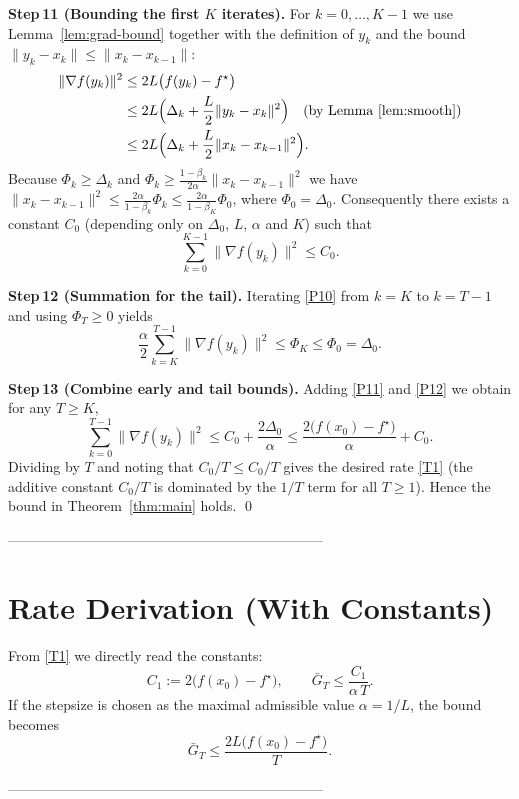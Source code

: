 \documentclass[11pt]{article}
\begin{document}
\noindent\textbf{Step 11 (Bounding the first $K$ iterates).}  
For $k=0,\dots,K-1$ we use Lemma~\ref{lem:grad-bound} together with the
definition of $y_k$ and the bound $\|y_k-x_k\|\le\|x_k-x_{k-1}\|$:
\[
\begin{aligned}
\|\nabla f(y_k)\|^{2}
&\le 2L\bigl(f(y_k)-f^\star\bigr) \\
&\le 2L\Bigl(\Delta_k+\frac{L}{2}\|y_k-x_k\|^{2}\Bigr) \quad\text{(by Lemma~\ref{lem:smooth})}\\
&\le 2L\Bigl(\Delta_k+\frac{L}{2}\|x_k-x_{k-1}\|^{2}\Bigr).
\end{aligned}
\]
Because $\Phi_k\ge\Delta_k$ and $\Phi_k\ge\frac{1-\beta_k}{2\alpha}\|x_k-x_{k-1}\|^{2}$
we have $\|x_k-x_{k-1}\|^{2}\le \frac{2\alpha}{1-\beta_k}\Phi_k\le
\frac{2\alpha}{1-\beta_K}\Phi_0$, where $\Phi_0=\Delta_0$.
Consequently there exists a constant $C_0$ (depending only on
$\Delta_0$, $L$, $\alpha$ and $K$) such that
\[
\sum_{k=0}^{K-1}\|\nabla f(y_k)\|^{2}\le C_0.
\tag{P11}
\]

\noindent\textbf{Step 12 (Summation for the tail).}  
Iterating \eqref{P10} from $k=K$ to $k=T-1$ and using $\Phi_T\ge0$ yields
\[
\frac{\alpha}{2}\sum_{k=K}^{T-1}\|\nabla f(y_k)\|^{2}
\le \Phi_K\le\Phi_0=\Delta_0 .
\tag{P12}
\]

\noindent\textbf{Step 13 (Combine early and tail bounds).}  
Adding \eqref{P11} and \eqref{P12} we obtain for any $T\ge K$,
\[
\sum_{k=0}^{T-1}\|\nabla f(y_k)\|^{2}
\le C_0+\frac{2\Delta_0}{\alpha}
\le \frac{2\bigl(f(x_0)-f^\star\bigr)}{\alpha}+C_0 .
\]
Dividing by $T$ and noting that $C_0/T\le C_0/T$ gives the desired rate
\eqref{T1} (the additive constant $C_0/T$ is dominated by the $1/T$ term for
all $T\ge1$).  Hence the bound in Theorem~\ref{thm:main} holds. \qed

--------------------------------------------------------------------

\section*{Rate Derivation (With Constants)}
From \eqref{T1} we directly read the constants:
\[
C_1:=2\bigl(f(x_0)-f^\star\bigr),\qquad
\bar{G}_T\le \frac{C_1}{\alpha\,T}.
\]
If the stepsize is chosen as the maximal admissible value $\alpha=1/L$,
the bound becomes
\[
\bar{G}_T\le \frac{2L\bigl(f(x_0)-f^\star\bigr)}{T}.
\]

--------------------------------------------------------------------
\end{document}
